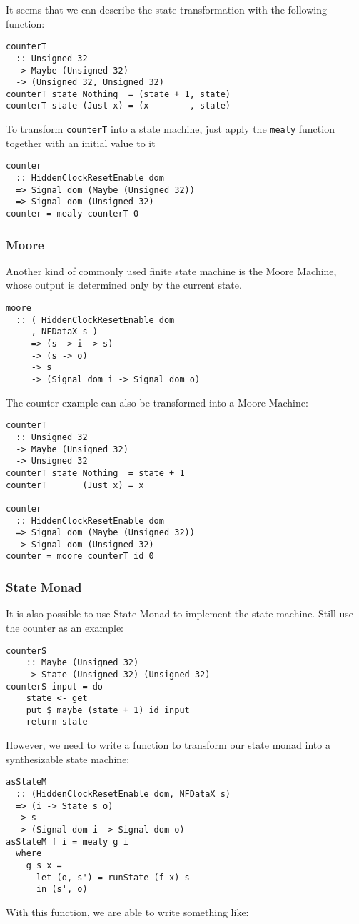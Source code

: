 It seems that we can describe the state transformation with the following function:
\begin{verbatim}
counterT 
  :: Unsigned 32 
  -> Maybe (Unsigned 32) 
  -> (Unsigned 32, Unsigned 32)
counterT state Nothing  = (state + 1, state)
counterT state (Just x) = (x        , state)
\end{verbatim}
To transform \texttt{counterT} into a state machine, just apply the \texttt{mealy} function together with an initial value to it
\begin{verbatim}
counter 
  :: HiddenClockResetEnable dom
  => Signal dom (Maybe (Unsigned 32))
  => Signal dom (Unsigned 32)
counter = mealy counterT 0
\end{verbatim}
\subsubsection{Moore}
Another kind of commonly used finite state machine is the Moore Machine, whose output is determined only by the current state.
\begin{verbatim}
moore
  :: ( HiddenClockResetEnable dom
     , NFDataX s )
     => (s -> i -> s)
     -> (s -> o)
     -> s
     -> (Signal dom i -> Signal dom o)
\end{verbatim}
The counter example can also be transformed into a Moore Machine:
\begin{verbatim}
counterT 
  :: Unsigned 32 
  -> Maybe (Unsigned 32) 
  -> Unsigned 32
counterT state Nothing  = state + 1
counterT _     (Just x) = x

counter 
  :: HiddenClockResetEnable dom
  => Signal dom (Maybe (Unsigned 32))
  -> Signal dom (Unsigned 32)
counter = moore counterT id 0
\end{verbatim}
\subsubsection{State Monad}
It is also possible to use State Monad to implement the state machine.
Still use the counter as an example:
\begin{verbatim}
counterS 
    :: Maybe (Unsigned 32)
    -> State (Unsigned 32) (Unsigned 32)
counterS input = do
    state <- get
    put $ maybe (state + 1) id input
    return state
\end{verbatim}
However, we need to write a function to transform our state monad into a synthesizable state machine:
\begin{verbatim}
asStateM 
  :: (HiddenClockResetEnable dom, NFDataX s)
  => (i -> State s o)
  -> s
  -> (Signal dom i -> Signal dom o)
asStateM f i = mealy g i
  where
    g s x =
      let (o, s') = runState (f x) s
      in (s', o)
\end{verbatim}
With this function, we are able to write something like: 

